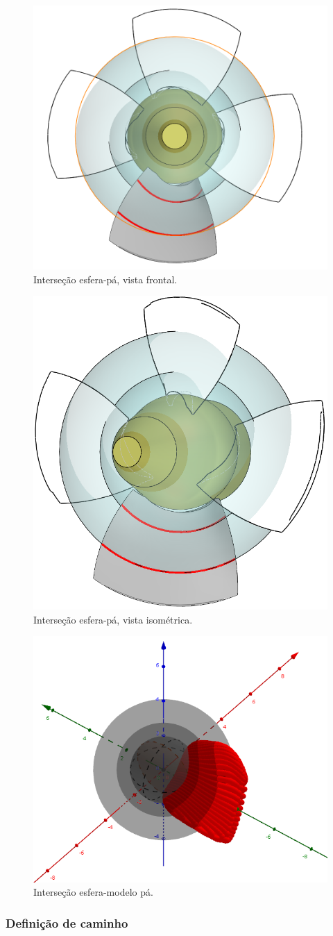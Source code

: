 \begin{figure}[t!]
	\centering
	\includegraphics[width=0.5\columnwidth]{figs/planejamento/intersecao_frontal.PNG}
	\caption{Interseção esfera-pá, vista frontal.}
	\label{fig::interfrontal}
\end{figure}

\begin{figure}[t!]
	\centering
	\includegraphics[width=0.5\columnwidth]{figs/planejamento/intersecao_iso.PNG}
	\caption{Interseção esfera-pá, vista isométrica.}
	\label{fig::interiso}
\end{figure}

\begin{figure}[t!]
	\centering
	\includegraphics[width=0.5\columnwidth]{figs/planejamento/intersecao_geogebra.png}
	\caption{Interseção esfera-modelo pá.}
	\label{fig::intergeo}
\end{figure}


\subsubsection{Definição de caminho}
